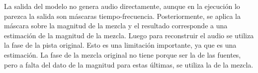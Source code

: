 La salida del modelo no genera audio directamente, aunque en la ejecución lo parezca la salida son máscaras tiempo-frecuencia. Posteriormente, se aplica la máscara sobre la magnitud de la mezcla y el resultado corresponde a una estimación de la magnitud de la mezcla.
Luego para reconstruir el audio se utiliza la fase de la pista original. Esto es una limitación importante, ya que es una estimación. La fase de la mezcla original no tiene porque ser la de las fuentes, pero a falta del dato de la magnitud para estas últimas, se utiliza la de la mezcla.




